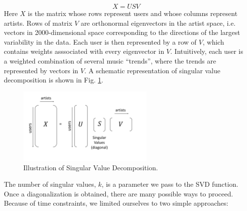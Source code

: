 \documentclass[11pt]{article}
\begin{document}
\begin{equation}
X = USV
\end{equation}
Here $X$ is the matrix whose rows represent users and whose columns represent artists. Rows of matrix $V$ are orthonormal eigenvectors in the artist space, i.e. vectors in 2000-dimensional space corresponding to the directions of the largest variability in the data. Each user is then represented by a row of $V$, which contains weights asssociated with every eigenvector in $V$. Intuitively, each user is a weighted combination of several music ``trends'', where the trends are represented by vectors in $V$. A schematic representation of singular value decomposition is shown in Fig. \ref{SVD}.
\begin{figure}[] 
\centering
        \includegraphics[width=0.6\textwidth]{Plots/SVD.pdf}
        \caption{Illustration of Singular Value Decomposition.}
            \label{SVD}
\end{figure}

The number of singular values, $k$, is a parameter we pass to the SVD function. Once a diagonalization is obtained, there are many possible ways to proceed. Because of time constraints, we limited ourselves to two simple approaches:
\end{document}

